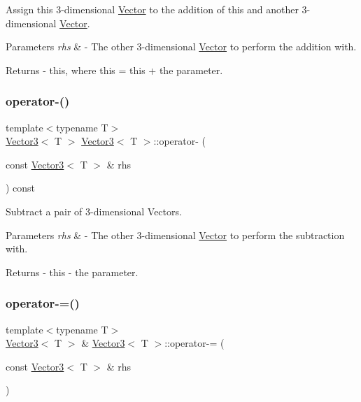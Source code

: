 Assign this 3-\/dimensional \mbox{\hyperlink{class_vector}{Vector}} to the addition of this and another 3-\/dimensional \mbox{\hyperlink{class_vector}{Vector}}. 
\begin{DoxyParams}{Parameters}
{\em rhs} & -\/ The other 3-\/dimensional \mbox{\hyperlink{class_vector}{Vector}} to perform the addition with. \\
\hline
\end{DoxyParams}
\begin{DoxyReturn}{Returns}
-\/ this, where \textquotesingle{}this = this + the parameter\textquotesingle{}. 
\end{DoxyReturn}
\mbox{\label{class_vector3_a385caaf9d5ce60bc720b8304d9c98937}} 
\subsubsection{\texorpdfstring{operator-\/()}{operator-()}}
{\footnotesize\ttfamily template$<$typename T$>$ \\
\mbox{\hyperlink{class_vector3}{Vector3}}$<$ T $>$ \mbox{\hyperlink{class_vector3}{Vector3}}$<$ T $>$\+::operator-\/ (\begin{DoxyParamCaption}\item[{const \mbox{\hyperlink{class_vector3}{Vector3}}$<$ T $>$ \&}]{rhs }\end{DoxyParamCaption}) const}

Subtract a pair of 3-\/dimensional Vectors. 
\begin{DoxyParams}{Parameters}
{\em rhs} & -\/ The other 3-\/dimensional \mbox{\hyperlink{class_vector}{Vector}} to perform the subtraction with. \\
\hline
\end{DoxyParams}
\begin{DoxyReturn}{Returns}
-\/ this -\/ the parameter. 
\end{DoxyReturn}
\mbox{\label{class_vector3_a57ae63fe916c0042a46545780b23c05e}} 
\subsubsection{\texorpdfstring{operator-\/=()}{operator-=()}}
{\footnotesize\ttfamily template$<$typename T$>$ \\
\mbox{\hyperlink{class_vector3}{Vector3}}$<$ T $>$ \& \mbox{\hyperlink{class_vector3}{Vector3}}$<$ T $>$\+::operator-\/= (\begin{DoxyParamCaption}\item[{const \mbox{\hyperlink{class_vector3}{Vector3}}$<$ T $>$ \&}]{rhs }\end{DoxyParamCaption})}

